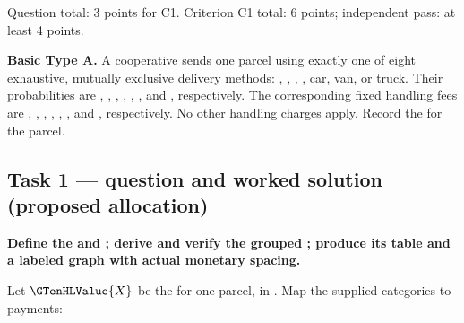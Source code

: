 Question total: 3 points for C1. Criterion C1 total: 6 points; independent pass: at least 4 points.

\par\vspace{3mm}\secInicio[][sec:q2]

\clearpage
{}

\textbf{Basic Type A.} A cooperative sends one parcel using exactly one of eight exhaustive, mutually exclusive delivery methods: , , , , car, van,  or truck. Their probabilities are , , , , , ,  and , respectively. The corresponding fixed handling fees are , , , , , ,  and , respectively. No other handling charges apply. Record the  for the parcel.

\subsection*{Task 1 --- question and worked solution (proposed allocation) }
\label{sol:q3t1}

\noindent\textbf{\boldmath Define the  and ; derive and verify the grouped ; produce its table and a labeled graph with actual monetary spacing.}\par\nopagebreak

Let $\GTenHLValue{X}$ be the  for one parcel, in . Map the supplied categories to payments:

